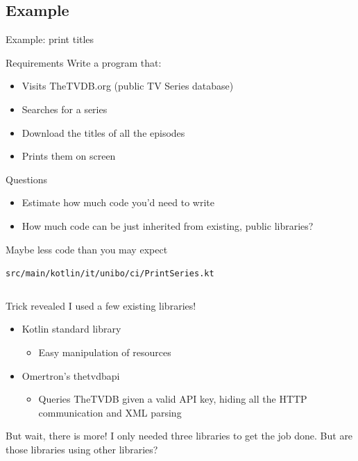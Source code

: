 \documentclass[presentation]{beamer}
\newcommand{\codefile}[4]{
	\begin{block}{\texttt{#2}}
		\inputminted[fontsize=#3,linenos=true,breaklines=true]{#4}{"workspace/#1/#2"}
	\end{block}
}
\newcommand{\kotlin}[3]{\codefile{#1}{#2}{#3}{kotlin}}
\begin{document}
\subsection{Example}
\begin{frame}[fragile]{Example: print titles}
	\begin{block}{Requirements}
		Write a program that:
		\begin{itemize}
			\item Visits TheTVDB.org (public TV Series database)
			\item Searches for a series
			\item Download the titles of all the episodes
			\item Prints them on screen
		\end{itemize}
	\end{block}
	\begin{block}{Questions}
		\begin{itemize}
			\item Estimate how much code you'd need to write
			\item How much code can be just inherited from existing, public libraries?
		\end{itemize}
	\end{block}
\end{frame}

\begin{frame}[fragile]{Maybe less code than you may expect}
	\kotlin{01-dependencies}{src/main/kotlin/it/unibo/ci/PrintSeries.kt}{\tiny}
\end{frame}

\begin{frame}[fragile]{Trick revealed}
  I used a few existing libraries!
  \begin{itemize}
    \item Kotlin standard library
    \begin{itemize}
      \item Easy manipulation of resources
    \end{itemize}
    \item Omertron's thetvdbapi
    \begin{itemize}
      \item Queries TheTVDB given a valid API key, hiding all the HTTP communication and XML parsing
    \end{itemize}
  \end{itemize}
  \begin{block}{But wait, there is more!}
    I only needed three libraries to get the job done. But are those libraries using other libraries?
  \end{block}
\end{frame}
\end{document}
